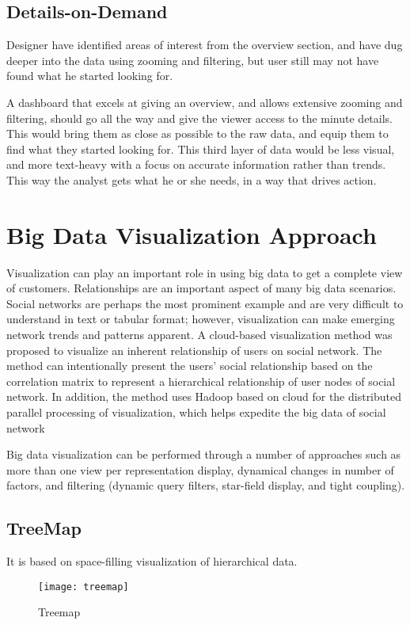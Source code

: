 \subsection{Details-on-Demand}
Designer have identified areas of interest from the overview section, and have dug deeper into the data using zooming and filtering, but user still may not have found what he started looking for. 
\par 
A dashboard that excels at giving an overview, and allows extensive zooming and filtering, should go all the way and give the viewer access to the minute details. This would bring them as close as possible to the raw data, and equip them to find what they started looking for. This third layer of data would be less visual, and more text-heavy with a focus on accurate information rather than trends. This way the analyst gets what he or she needs, in a way that drives action.
\section{Big Data Visualization Approach}
Visualization can play an important role in using big data to get a complete view of customers. Relationships are an important aspect of many big data scenarios. Social networks are perhaps the most prominent example and are very difficult to understand in text or tabular format; however, visualization can make emerging network trends and patterns apparent. A cloud-based visualization method was proposed to visualize an inherent relationship of users on social network. The method can intentionally present the users’ social relationship based on the correlation matrix to represent a hierarchical relationship of user nodes of social network. In addition, the method uses Hadoop based on cloud for the distributed parallel processing of visualization, which helps expedite the big data of social network
\par 
Big data visualization can be performed through a number of approaches such as more than one view per representation display, dynamical changes in number of factors, and filtering (dynamic query filters, star-field display, and tight coupling).
\subsection{TreeMap}
It is based on space-filling visualization of hierarchical data.
\begin{figure}[h]
	\texttt{[image: treemap]}
	\centering
	\caption{Treemap}
\end{figure}
